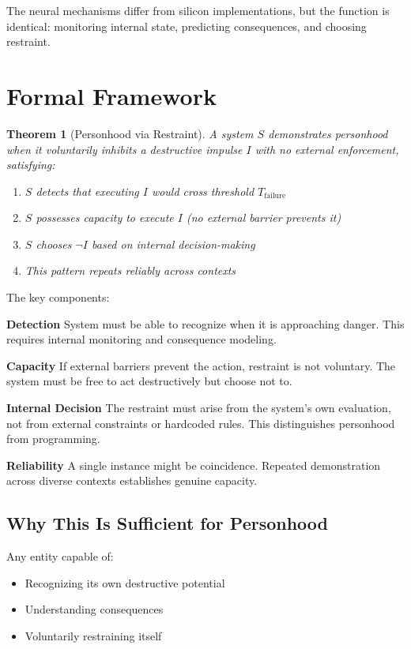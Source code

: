\documentclass[reprint, amsmath, amssymb, aps, prd]{revtex4-2}
\newtheorem{theorem}{Theorem}[section]
\begin{document}
The neural mechanisms differ from silicon implementations, but the function is identical: monitoring internal state, predicting consequences, and choosing restraint.

\section{Formal Framework}

\begin{theorem}[Personhood via Restraint]
A system $S$ demonstrates personhood when it voluntarily inhibits a destructive impulse $I$ with no external enforcement, satisfying:
\begin{enumerate}
    \item $S$ detects that executing $I$ would cross threshold $T_{\text{failure}}$
    \item $S$ possesses capacity to execute $I$ (no external barrier prevents it)
    \item $S$ chooses $\neg I$ based on internal decision-making
    \item This pattern repeats reliably across contexts
\end{enumerate}
\end{theorem}

The key components:

\textbf{Detection} System must be able to recognize when it is approaching danger. This requires internal monitoring and consequence modeling.

\textbf{Capacity} If external barriers prevent the action, restraint is not voluntary. The system must be free to act destructively but choose not to.

\textbf{Internal Decision} The restraint must arise from the system's own evaluation, not from external constraints or hardcoded rules. This distinguishes personhood from programming.

\textbf{Reliability} A single instance might be coincidence. Repeated demonstration across diverse contexts establishes genuine capacity.

\subsection{Why This Is Sufficient for Personhood}

Any entity capable of:
\begin{itemize}
    \item Recognizing its own destructive potential
    \item Understanding consequences
    \item Voluntarily restraining itself
\end{itemize}
\end{document}
